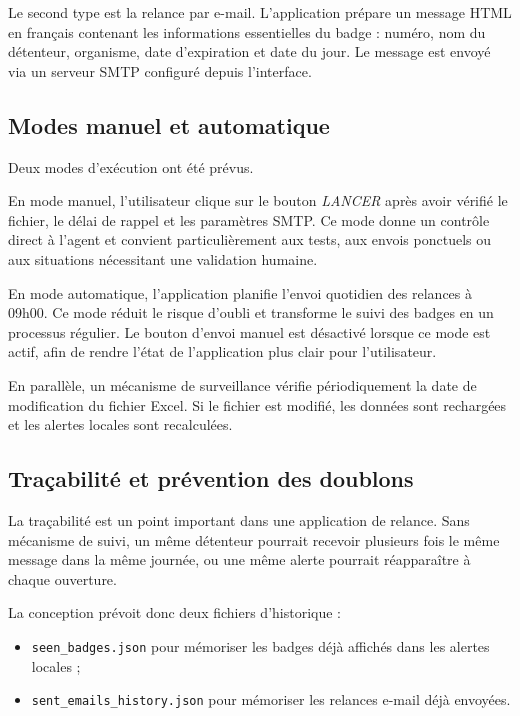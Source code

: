 \documentclass[12pt,a4paper,openany]{report}
\begin{document}
Le second type est la relance par e-mail. L'application prépare un message HTML
en français contenant les informations essentielles du badge : numéro, nom du
détenteur, organisme, date d'expiration et date du jour. Le message est envoyé
via un serveur SMTP configuré depuis l'interface.

\subsection{Modes manuel et automatique}

Deux modes d'exécution ont été prévus.

En mode manuel, l'utilisateur clique sur le bouton \textit{LANCER} après avoir
vérifié le fichier, le délai de rappel et les paramètres SMTP. Ce mode donne un
contrôle direct à l'agent et convient particulièrement aux tests, aux envois
ponctuels ou aux situations nécessitant une validation humaine.

En mode automatique, l'application planifie l'envoi quotidien des relances à
09h00. Ce mode réduit le risque d'oubli et transforme le suivi des badges en un
processus régulier. Le bouton d'envoi manuel est désactivé lorsque ce mode est
actif, afin de rendre l'état de l'application plus clair pour l'utilisateur.

En parallèle, un mécanisme de surveillance vérifie périodiquement la date de
modification du fichier Excel. Si le fichier est modifié, les données sont
rechargées et les alertes locales sont recalculées.

\subsection{Traçabilité et prévention des doublons}

La traçabilité est un point important dans une application de relance. Sans
mécanisme de suivi, un même détenteur pourrait recevoir plusieurs fois le même
message dans la même journée, ou une même alerte pourrait réapparaître à chaque
ouverture.

La conception prévoit donc deux fichiers d'historique :

\begin{itemize}
  \item \texttt{seen\_badges.json} pour mémoriser les badges déjà affichés dans
  les alertes locales ;
  \item \texttt{sent\_emails\_history.json} pour mémoriser les relances e-mail
  déjà envoyées.
\end{itemize}
\end{document}
